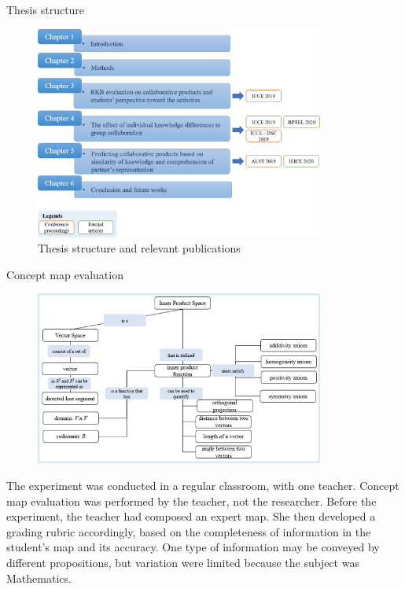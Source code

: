 \begin{frame}{Thesis structure}
   \begin{figure}[tb]
       \begin{center}
           \includegraphics[width=95mm]{images/thesis_structures.pdf} 
       \end{center}
       \caption{Thesis structure and relevant publications}
       \label{thesis_struct}
   \end{figure}
\end{frame}

\begin{frame}[allowframebreaks]{Concept map evaluation}
   \begin{figure}[tb]
       \begin{center}
           \includegraphics[width=95mm]{images/expert_map.png} 
       \end{center}
   \end{figure}
   The experiment was conducted in a regular classroom, with one teacher. 
Concept map evaluation was performed by the teacher, not the researcher. 
Before the experiment, the teacher had composed an expert map.
She then developed a grading rubric accordingly, based on the completeness of information in the student’s map and its accuracy. 
One type of information may be conveyed by different propositions, but variation were limited because the subject was Mathematics. 

\end{frame}